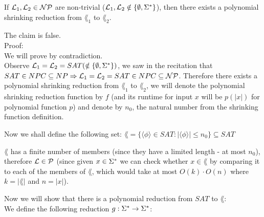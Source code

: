 If $\mathcal{L}_1, \mathcal{L}_2 \in \mathcal{N}\mathcal{P}$ are non-trivial ($\mathcal{L}_1, \mathcal{L}_2 \notin \{\emptyset, \Sigma^*\}$), then there exists a polynomial shrinking
reduction from $\lang_1$ to $\lang_2$.

The claim is false. \\

Proof: \\
We will prove by contradiction. \\ Observe $\mathcal{L}_1 = \mathcal{L}_2 = SAT (\notin \{\emptyset, \Sigma^*\})$, we saw in the recitation that
$SAT \in NPC \subseteq NP \Rightarrow \mathcal{L}_1 = \mathcal{L}_2 = SAT \in NPC \subseteq \mathcal{N}\mathcal{P}$. Therefore there exists a polynomial shrinking
reduction from $\lang_1$ to $\lang_2$, we will denote the polynomial shrinking reduction function by $f$ (and its runtime for input $x$
will be $p(|x|)$ for polynomial function $p$) and denote by $n_0$, the natural number from the shrinking function definition.

Now we shall define the following set:
$
    \lang = \{\langle \phi \rangle \in SAT: |\langle \phi \rangle| \leq n_0 \} \subseteq SAT\
$

$\lang$ has a finite number of members (since they have a limited length - at most $n_0$), therefore \underline{$\mathcal{L} \in \mathcal{P}$} (since given $x \in \Sigma^*$ we can check whether $x \in \lang$ by
comparing it to each of the members of $\lang$, which would take at most $O(k) \cdot O(n)$ where $k=|\lang|$ and $n=|x|$).

Now we will show that there is a polynomial reduction from $SAT$ to $\lang$: \\
We define the following reduction $g: \Sigma^* \rightarrow \Sigma^*$:
\pagebreak

